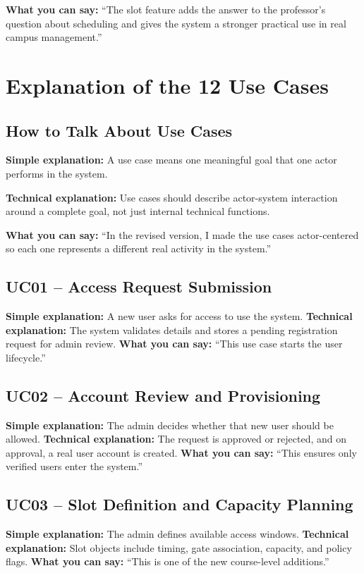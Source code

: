 \documentclass[12pt,letterpaper]{article}
\newcommand{\simple}[1]{\textbf{Simple explanation:} #1}
\newcommand{\technical}[1]{\textbf{Technical explanation:} #1}
\newcommand{\say}[1]{\textbf{What you can say:} ``#1''}
\begin{document}
\say{The slot feature adds the answer to the professor’s question about scheduling and gives the system a stronger practical use in real campus management.}

\section{Explanation of the 12 Use Cases}

\subsection{How to Talk About Use Cases}

\simple{A use case means one meaningful goal that one actor performs in the system.}

\technical{Use cases should describe actor-system interaction around a complete goal, not just internal technical functions.}

\say{In the revised version, I made the use cases actor-centered so each one represents a different real activity in the system.}

\subsection{UC01 -- Access Request Submission}
\simple{A new user asks for access to use the system.}
\technical{The system validates details and stores a pending registration request for admin review.}
\say{This use case starts the user lifecycle.}

\subsection{UC02 -- Account Review and Provisioning}
\simple{The admin decides whether that new user should be allowed.}
\technical{The request is approved or rejected, and on approval, a real user account is created.}
\say{This ensures only verified users enter the system.}

\subsection{UC03 -- Slot Definition and Capacity Planning}
\simple{The admin defines available access windows.}
\technical{Slot objects include timing, gate association, capacity, and policy flags.}
\say{This is one of the new course-level additions.}
\end{document}
